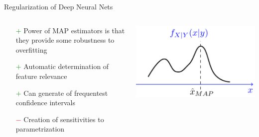 \documentclass{beamer}
\begin{document}
\begin{frame}{Regularization of Deep Neural Nets}
	\begin{tcolorbox}[enhanced,size=fbox,fontupper=\large\bfseries, colback=black!80, colframe=black!80]
		\begin{center}
			\text{\textcolor{white}{More robust loss function using MAP estimation instead}}
		\end{center}
	\end{tcolorbox}
	\vspace{0.2cm}
	\begin{columns}[T] %
		\begin{column}{.7\textwidth}
			\vspace{-0.5cm}
			\begin{itemize}
				\item[\textcolor{green}{$+$}] Power of MAP estimators is that they provide some robustness to overfitting
				\item[\textcolor{green}{$+$}] Automatic determination of feature relevance
				\item[\textcolor{green}{$+$}] Can generate of frequentest confidence intervals
				\item[\textcolor{red}{$-$}] Creation of sensitivities to parametrization
			\end{itemize}
		\end{column}
		\hfill%
		\hspace{-1.2cm}
		\begin{column}{.53\textwidth}
			\vspace{-0.5cm}
			\begin{center}
				\vspace{-0.5cm}
				\includegraphics[scale=0.25]{./img/map.png}
			\end{center}
		\end{column}%
	\end{columns}
\end{frame}
\end{document}
